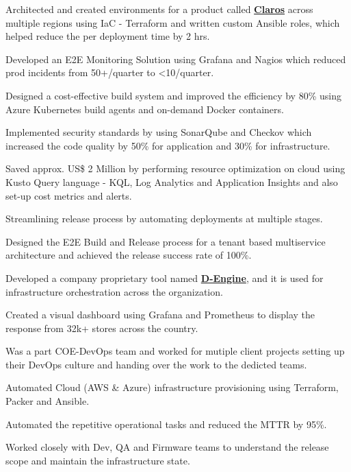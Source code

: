 \documentclass[a4paper]{deedy-resume-openfont}
\begin{document}
\begin{tightemize}
\item Architected and created environments for a product called \href{https://www.hach.com/claros/overview#claros-video}{\bf Claros} across multiple regions using IaC - Terraform and written custom Ansible roles, which helped reduce the per deployment time by 2 hrs.
\item Developed an E2E Monitoring Solution using Grafana and Nagios which reduced prod incidents from 50+/quarter to <10/quarter.
\item Designed a cost-effective build system and improved the efficiency by 80\% using Azure Kubernetes build agents and on-demand Docker containers.
\item Implemented security standards by using SonarQube and Checkov which increased the code quality by 50\% for application and 30\% for infrastructure.
\item Saved approx. US\$ 2 Million by performing resource optimization on cloud using Kusto Query language - KQL, Log Analytics and Application Insights and also set-up cost metrics and alerts.
\item Streamlining release process by automating deployments at multiple stages.
\end{tightemize}
\sectionsep

\begin{tightemize}
\item Designed the E2E Build and Release process for a tenant based multiservice architecture and achieved the release success rate of 100\%.
\item Developed a company proprietary tool named \href{https://www.youtube.com/watch?v=YWLU2OU13tA}{\bf D-Engine}, and it is used for infrastructure orchestration across the organization.
\item Created a visual dashboard using Grafana and Prometheus to display the response from 32k+ stores across the country.
\item Was a part COE-DevOps team and worked for mutiple client projects setting up their DevOps culture and handing over the work to the dedicted teams.
\item Automated Cloud (AWS \& Azure) infrastructure provisioning using Terraform, Packer and Ansible.
\item Automated the repetitive operational tasks and reduced the MTTR by 95\%.
\item Worked closely with Dev, QA and Firmware teams to understand the release scope and maintain the infrastructure state.
\end{tightemize}
\end{document}

